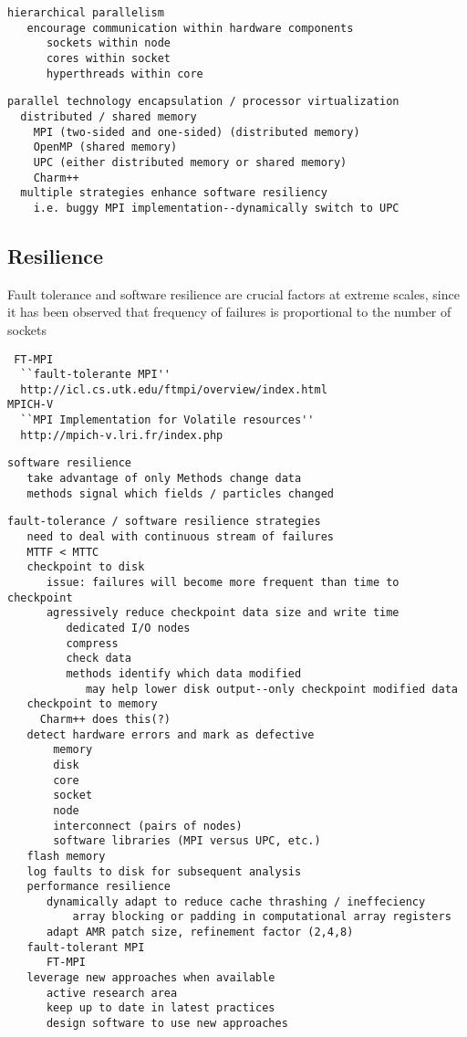 \documentclass[10pt,twocolumn]{article}
\begin{document}
{\begin{verbatim}
hierarchical parallelism
   encourage communication within hardware components
      sockets within node
      cores within socket
      hyperthreads within core
\end{verbatim}

\begin{verbatim}
parallel technology encapsulation / processor virtualization
  distributed / shared memory
    MPI (two-sided and one-sided) (distributed memory)
    OpenMP (shared memory) 
    UPC (either distributed memory or shared memory)
    Charm++
  multiple strategies enhance software resiliency
    i.e. buggy MPI implementation--dynamically switch to UPC
\end{verbatim}
}
\subsection{Resilience} \label{ss:design-resilience}

Fault tolerance and software resilience are crucial factors at extreme
scales, since it has been observed that frequency of failures is
proportional to the number of sockets~\cite{@@@fault-sockets}

{\tiny
\begin{verbatim}
 FT-MPI 
  ``fault-tolerante MPI''
  http://icl.cs.utk.edu/ftmpi/overview/index.html 
MPICH-V 
  ``MPI Implementation for Volatile resources''
  http://mpich-v.lri.fr/index.php 
\end{verbatim}


\begin{verbatim}
software resilience
   take advantage of only Methods change data
   methods signal which fields / particles changed
\end{verbatim}
\begin{verbatim}
fault-tolerance / software resilience strategies
   need to deal with continuous stream of failures
   MTTF < MTTC
   checkpoint to disk
      issue: failures will become more frequent than time to checkpoint
      agressively reduce checkpoint data size and write time
         dedicated I/O nodes
         compress
         check data
         methods identify which data modified
            may help lower disk output--only checkpoint modified data
   checkpoint to memory
     Charm++ does this(?)
   detect hardware errors and mark as defective
       memory
       disk
       core
       socket
       node
       interconnect (pairs of nodes)
       software libraries (MPI versus UPC, etc.)
   flash memory
   log faults to disk for subsequent analysis
   performance resilience
      dynamically adapt to reduce cache thrashing / ineffeciency
          array blocking or padding in computational array registers
      adapt AMR patch size, refinement factor (2,4,8)
   fault-tolerant MPI
      FT-MPI
   leverage new approaches when available
      active research area
      keep up to date in latest practices
      design software to use new approaches
\end{verbatim}
}
\end{document}
